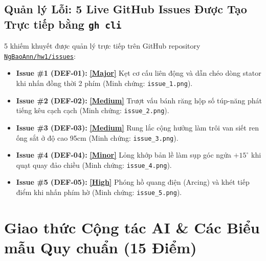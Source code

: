 \documentclass[11pt,a4paper]{article}
\newcommand{\filepath}[1]{\nolinkurl{#1}}
\begin{document}
\subsection{Quản lý Lỗi: 5 Live GitHub Issues Được Tạo Trực tiếp bằng \texttt{gh cli}}
5 khiếm khuyết được quản lý trực tiếp trên GitHub repository \href{https://github.com/NgBaoAnn/hw1/issues}{\texttt{NgBaoAnn/hw1/issues}}:
\begin{itemize}
    \item \textbf{Issue \#1 (DEF-01):} \href{https://github.com/NgBaoAnn/hw1/issues/1}{\textbf{[Major]}} Kẹt cơ cấu liên động và dẫn chéo dòng stator khi nhấn đồng thời 2 phím (Minh chứng: \filepath{issue_1.png}).
    \item \textbf{Issue \#2 (DEF-02):} \href{https://github.com/NgBaoAnn/hw1/issues/2}{\textbf{[Medium]}} Trượt vấu bánh răng hộp số túp-năng phát tiếng kêu cạch cạch (Minh chứng: \filepath{issue_2.png}).
    \item \textbf{Issue \#3 (DEF-03):} \href{https://github.com/NgBaoAnn/hw1/issues/3}{\textbf{[Medium]}} Rung lắc cộng hưởng làm trôi van siết ren ống sắt ở độ cao 95cm (Minh chứng: \filepath{issue_3.png}).
    \item \textbf{Issue \#4 (DEF-04):} \href{https://github.com/NgBaoAnn/hw1/issues/4}{\textbf{[Minor]}} Lỏng khớp bản lề làm sụp góc ngửa $+15^\circ$ khi quạt quay đảo chiều (Minh chứng: \filepath{issue_4.png}).
    \item \textbf{Issue \#5 (DEF-05):} \href{https://github.com/NgBaoAnn/hw1/issues/5}{\textbf{[High]}} Phóng hồ quang điện (Arcing) và khét tiếp điểm khi nhấn phím hờ (Minh chứng: \filepath{issue_5.png}).
\end{itemize}

\newpage
\section{Giao thức Cộng tác AI \& Các Biểu mẫu Quy chuẩn (15 Điểm)}
\end{document}
